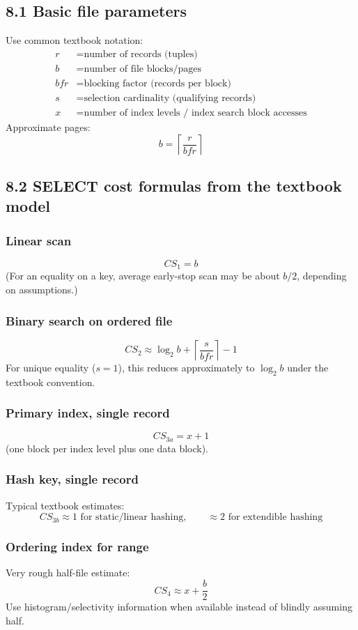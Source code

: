 \documentclass[10pt,a4paper]{article}
\begin{document}
\subsection{8.1 Basic file parameters}
Use common textbook notation:
\begin{align*}
r &= \text{number of records (tuples)}\\
b &= \text{number of file blocks/pages}\\
bfr &= \text{blocking factor (records per block)}\\
s &= \text{selection cardinality (qualifying records)}\\
x &= \text{number of index levels / index search block accesses}
\end{align*}
Approximate pages:
\[
\boxed{b=\left\lceil\frac{r}{bfr}\right\rceil}
\]

\subsection{8.2 SELECT cost formulas from the textbook model}
\subsubsection*{Linear scan}
\[
\boxed{CS_1=b}
\]
(For an equality on a key, average early-stop scan may be about $b/2$, depending on assumptions.)

\subsubsection*{Binary search on ordered file}
\[
\boxed{CS_2\approx \log_2 b+\left\lceil\frac{s}{bfr}\right\rceil-1}
\]
For unique equality ($s=1$), this reduces approximately to $\log_2 b$ under the textbook convention.

\subsubsection*{Primary index, single record}
\[
\boxed{CS_{3a}=x+1}
\]
(one block per index level plus one data block).

\subsubsection*{Hash key, single record}
Typical textbook estimates:
\[
\boxed{CS_{3b}\approx 1\text{ for static/linear hashing},\qquad \approx2\text{ for extendible hashing}}
\]

\subsubsection*{Ordering index for range}
Very rough half-file estimate:
\[
\boxed{CS_4\approx x+\frac{b}{2}}
\]
Use histogram/selectivity information when available instead of blindly assuming half.
\end{document}
